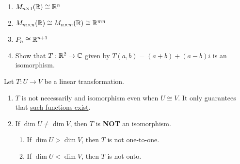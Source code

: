 \begin{example}
\leavevmode
\begin{enumerate}
    \item $M_{n \times 1}(\mathbb{R}) \cong \mathbb{R}^n$
    \item $M_{m \times n}(\mathbb{R}) \cong M_{n \times m}(\mathbb{R}) \cong \mathbb{R}^{mn}$
    \item $P_n \cong \mathbb{R}^{n + 1}$
    \item Show that $T: \mathbb{R}^2 \to \mathbb{C}$ given by $T(a, b) = (a + b) + (a - b)i$ is an isomorphism.
\end{enumerate}
\end{example}

\begin{remark}
Let $T: U \to V$ be a linear transformation.
\begin{enumerate}
    \item $T$ is not necessarily and isomorphism even when $U \cong V$. It only guarantees that \ul{such functions exist}.
    \item If $\dim U \neq \dim V$, then $T$ is \textbf{NOT} an isomorphism.
    \begin{enumerate}
        \item If $\dim U > \dim V$, then $T$ is not one-to-one.
        \item If $\dim U < \dim V$, then $T$ is not onto.
    \end{enumerate}
\end{enumerate}
\end{remark}